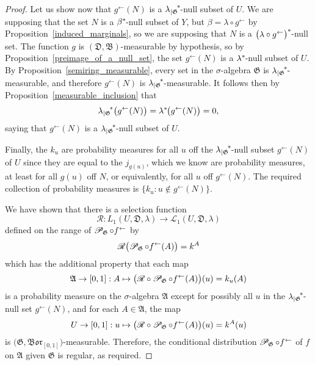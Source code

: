 \documentclass[
twoside=true,
paper=letter,
fontsize=9pt,
pagesize=auto,
leqno,
openany,
headsepline,
overfullrule,
]{scrbook}
\theoremstyle{plain}
\theoremstyle{plain}
\theoremstyle{definition}
\theoremstyle{bfnoteitalic}
\theoremstyle{bfnoteroman}
\newcommand{\sigalg}[1]{\mathfrak{#1}}
\newcommand{\cali}[1]{\mathscr{#1}}
\newcommand{\condprobop}[1]{\mathop{\cali{P}\hspace{-1pt}}\nolimits_{#1}}
\newcommand{\borel}{\mathfrak{Bor}}
\newcommand{\textsigma}{\hbox{\large{$\sigma$}}\kern-1pt}
\newcommand{\restrictedto}[1]{_{\lvert#1}\kern-1.5pt}
\newcommand{\preimage}[1]{#1^{\leftarrow}}
\newcommand{\sigmaalgebra}{\sigalg{A}}
\newcommand{\sigmaalgebraii}{\sigalg{B}}
\newcommand{\kernast}{\ast\kern-1pt}
\newcommand{\funcf}{f}
\newcommand{\funcg}{g}
\newcommand{\funcj}{j}
\newcommand{\funck}{k}
\newcommand{\function}{f}
\newcommand{\measurespaceii}{Y}
\newcommand{\measlambda}{\lambda}
\newcommand{\seti}{A}
\newcommand{\regular}{\cali{R}}
\newcommand{\uspace}{U}%
\newcommand{\uspaceelt}{u}
\newcommand{\uspacesig}{\sigalg{D}}
\newcommand{\marginaltwo}{\beta}%
\begin{document}
\begin{proof}
Let us show now that  $\preimage{\funcg}(N)$ is a
${\measlambda\restrictedto{\sigalg{G}}}^\kernast$\hyp{}null subset of $\uspace$.
We are supposing that the set
$N$ is a
$\marginaltwo^\kernast$\hyp{}null subset of $\measurespaceii$,
but
$\marginaltwo = \measlambda \circ \preimage{\funcg}$ by Proposition~\ref{induced_marginals}, so
we are supposing that $N$ is a
$\bigl(\measlambda\circ\preimage{\funcg}\bigr)^\kernast$\hyp{}null set.
The function
$\funcg$ is $(\uspacesig,\sigmaalgebraii)$\hyp{}measurable by hypothesis,
so by Proposition~\ref{preimage_of_a_null_set}, the set
$\preimage{\funcg}(N)$ is a $\measlambda^\kernast$\hyp{}null subset of $\uspace$.
By Proposition~\ref{semiring_measurable}, every set in the \textsigma\hyp{}algebra $\sigalg{G}$ is
${\measlambda\restrictedto{\sigalg{G}}}^\kernast$\hyp{}measurable, and therefore
$\preimage{\funcg}(N)$ is ${\measlambda\restrictedto{\sigalg{G}}}^\kernast$\hyp{}measurable.
It follows then by Proposition~\ref{measurable_inclusion} that
\[
{\measlambda\restrictedto{\sigalg{G}}}^* \bigl(\preimage{\funcg}(N)\bigr)
=
\lambda^\kernast\bigl(\preimage{\funcg}(N)\bigr)
= 0,
\]
saying that
$\preimage{\funcg}(N)$ is a
${\measlambda\restrictedto{\sigalg{G}}}^\kernast$\hyp{}null subset of $\uspace$.

Finally, the $\funck_\uspaceelt$ are probability measures for all $\uspaceelt$ off the
${\measlambda\restrictedto{\sigalg{G}}}^\kernast$\hyp{}null subset
$\preimage{\funcg}(N)$
of $\uspace$
since they are equal to the
$\funcj_{\funcg(\uspaceelt)}$, which we know are probability measures, at least for all
$\funcg(\uspaceelt)$ off $N$, or equivalently, for all $\uspaceelt$ off
$\preimage{\funcg}(N)$.
The required collection of probability measures is
$\{ \funck_\uspaceelt : \uspaceelt\notin \preimage{\funcg}(N) \}$.

We have shown that there is a selection function
\[
\regular:
L_1(\uspace,\uspacesig,\measlambda)
\to
\cali{L}_1(\uspace,\uspacesig,\measlambda)
\]
defined on the range of
$\condprobop{\sigalg{G}}\circ \preimage{\funcf}$
by
\[
\regular\bigl(
\condprobop{\sigalg{G}}\circ \preimage{\funcf}(\seti)
\bigr)
=
\funck^\seti
\]
which has the additional property that each map
\[
\sigmaalgebra\to [0,1]: \seti \mapsto
\bigl( \regular\circ\condprobop{\sigalg{G}} \circ\preimage{\function}
(\seti)\bigr)(\uspaceelt)
= \funck_\uspaceelt(\seti)
\]
is a probability measure on the \textsigma\hyp{}algebra $\sigmaalgebra$ except for possibly all
$\uspaceelt$ in the
${\measlambda\restrictedto{\sigalg{G}}}^\kernast$-null set
$\preimage{\funcg}(N)$,
and for each
$\seti\in\sigmaalgebra$, the map
\[
\uspace\to [0,1] : \uspaceelt\mapsto
\bigl( \regular\circ\condprobop{\sigalg{G}}\circ\preimage{\function}
(\seti)\bigr)(\uspaceelt)
= \funck^\seti(\uspaceelt)
\]
is $\bigl(\sigalg{G}, \borel_{[0,1]}\bigr)$\hyp{}measurable.
Therefore, the conditional distribution
$\condprobop{\sigalg{G}}\circ \preimage{\funcf}$ of $\funcf$ on
$\sigmaalgebra$ given $\sigalg{G}$ is regular, as required.
\end{proof}
\end{document}
